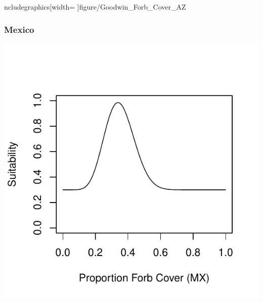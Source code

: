 \documentclass[12pt,letterpaper]{article}\usepackage{graphicx, color}
\makeatletter
\def\maxwidth{ %
  \ifdim\Gin@nat@width>\linewidth
    \linewidth
  \else
    \Gin@nat@width
  \fi
}
\newenvironment{knitrout}{}{} %
\makeatother
\begin{document}
\begin{knitrout}
ncludegraphics[width=\maxwidth]{figure/Goodwin_Forb_Cover_AZ} 
\end{knitrout}

\subsubsection{Mexico}
\begin{knitrout}
\color{fgcolor}\includegraphics[width=\maxwidth]{figure/Goodwin_Forb_Cover_MX} 
\end{knitrout}
\end{document}
